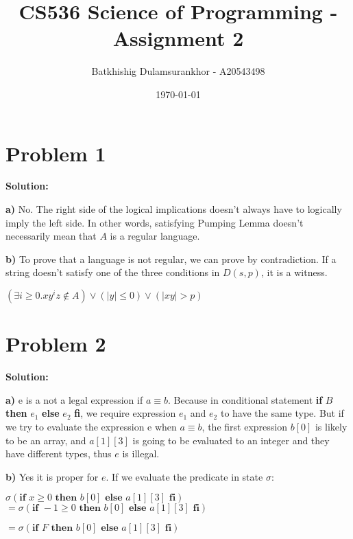 \documentclass{article}
\title{CS536 Science of Programming - Assignment 2}
\author{Batkhishig Dulamsurankhor - A20543498}
\date{\today} %
\begin{document}
\maketitle



\section*{Problem 1}
\textbf{Solution:}


\textbf{a)} No. The right side of the logical implications doesn't always have to logically imply the left side. In other words, satisfying Pumping Lemma doesn't necessarily mean that $A$ is a regular language.

\vspace{10pt}
\textbf{b)} To prove that a language is not regular, we can prove by contradiction. If a string doesn't satisfy one of the three conditions in $D(s,p)$, it is a witness.

\qquad $ (\exists i \geq 0.xy^iz \notin A) \vee (|y| \leq 0) \vee (|xy|>p) $



\section*{Problem 2}
\textbf{Solution:}

\textbf{a)} e is a not a legal expression if $a \equiv b$. Because in conditional statement {\bf if} $B$ {\bf then} $e_1$ {\bf else} $e_2$ {\bf fi}, we require expression $e_1$ and $e_2$ to have the same type. But if we try to evaluate the expression e when $a \equiv b$, the first expression $b[0]$ is likely to be an array, and $a[1][3]$ is going to be evaluated to an integer and they have different types, thus $e$ is illegal.
\vspace{10pt}

\textbf{b)} Yes it is proper for $e$. If we evaluate the predicate in state $\sigma$:

\qquad $\sigma (\textbf{if } x \geq 0 \textbf{ then } b[0] \textbf{ else } a[1][3]  \textbf{ fi})$ \qquad $= \sigma(\textbf{if } -1 \geq 0 \textbf{ then } b[0] \textbf{ else } a[1][3]  \textbf{ fi})$

\qquad \qquad \qquad \qquad \qquad \qquad \qquad \qquad \qquad \qquad $= \sigma(\textbf{if } F \textbf{ then } b[0] \textbf{ else } a[1][3]  \textbf{ fi})$
\end{document}
